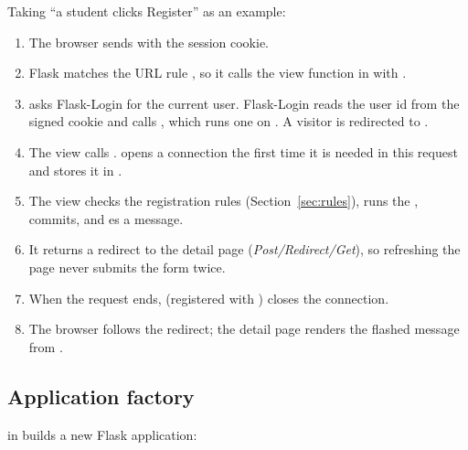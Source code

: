 \documentclass[11pt,a4paper]{article}
\begin{document}
Taking ``a student clicks \textsf{Register}'' as an example:

\begin{enumerate}
  \item The browser sends  with the session cookie.
  \item Flask matches the URL rule , so it calls the
        view function  in  with .
  \item {} asks Flask-Login for the current user. Flask-Login reads the user id
        from the signed cookie and calls , which runs one  on
        . A visitor is redirected to .
  \item The view calls .  opens a connection the first time it is
        needed in this request and stores it in .
  \item The view checks the registration rules (Section~\ref{sec:rules}), runs the
        , commits, and es a message.
  \item It returns a redirect to the detail page (\emph{Post/Redirect/Get}), so refreshing the page
        never submits the form twice.
  \item When the request ends,  (registered with )
        closes the connection.
  \item The browser follows the redirect; the detail page renders the flashed message from
        .
\end{enumerate}

\subsection{Application factory}

 in  builds a new Flask application:
\end{document}
